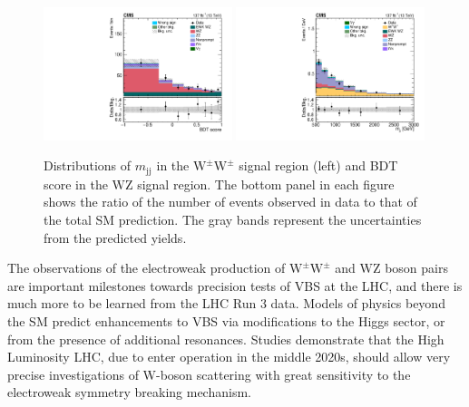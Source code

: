 \documentclass[12pt]{article}
\newcommand{\WZ}{\ensuremath{\mathrm{W}\mathrm{Z}}}
\newcommand{\WW}{\ensuremath{\mathrm{W}^\pm\mathrm{W}^\pm}}
\newcommand{\jet}{\ensuremath{\mathrm{j}}}
\newcommand{\mjj}{\ensuremath{m_{\jet\jet}}}
\begin{document}
\begin{figure}[htb]
\centering
\includegraphics[width=0.49\textwidth]{figures/ssww_wzsel_bdt_2019.pdf}
\includegraphics[width=0.49\textwidth]{figures/ssww_wwsel_mjj_2019.pdf}
\caption{Distributions of $\mjj$ in the $\WW$ signal region (left) and  BDT score in the $\WZ$ signal region. The bottom panel in each figure
shows the ratio of the number of events observed in data to that of the total SM prediction.
The gray bands represent the uncertainties from the predicted yields.}
\label{fig:signal}
\end{figure}

The observations of the  electroweak production of $\WW$ and $\WZ$  boson pairs are important milestones towards precision tests of VBS at the LHC, and there is much more to be learned from the LHC Run 3 data. Models of physics beyond the SM predict enhancements to VBS via modifications to the Higgs sector, or from the presence of additional resonances. Studies demonstrate that the High Luminosity LHC, due to enter operation in the middle 2020s, should allow very precise investigations of W-boson scattering with great sensitivity to the electroweak symmetry breaking mechanism.
\end{document}
